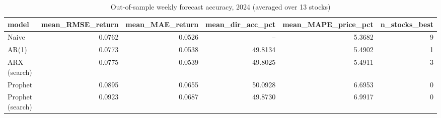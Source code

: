 \begin{table}[t]
\scriptsize
\centering
\caption{Out-of-sample weekly forecast accuracy, 2024 (averaged over 13 stocks)}
\label{tab:forecast_weekly}
\begin{tabular}{lrrrrr}
\toprule
model & mean\_RMSE\_return & mean\_MAE\_return & mean\_dir\_acc\_pct & mean\_MAPE\_price\_pct & n\_stocks\_best \\
\midrule
Naive & 0.0762 & 0.0526 & -- & 5.3682 & 9 \\
AR(1) & 0.0773 & 0.0538 & 49.8134 & 5.4902 & 1 \\
ARX (search) & 0.0775 & 0.0539 & 49.8025 & 5.4911 & 3 \\
Prophet & 0.0895 & 0.0655 & 50.0928 & 6.6953 & 0 \\
Prophet (search) & 0.0923 & 0.0687 & 49.8730 & 6.9917 & 0 \\
\bottomrule
\end{tabular}
\end{table}
